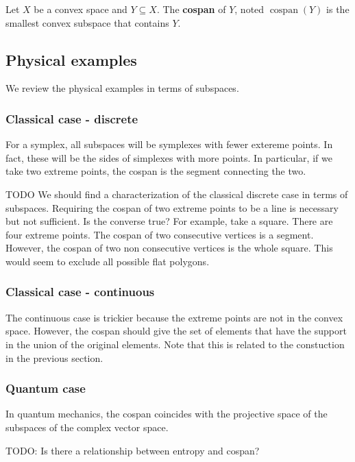 \documentclass[11pt]{article}
\DeclareMathOperator{\cospan}{cospan}
\begin{document}
\begin{defn}
	Let $X$ be a convex space and $Y \subseteq X$. The \textbf{cospan} of $Y$, noted $\cospan(Y)$ is the smallest convex subspace that contains $Y$.
\end{defn}


\subsection{Physical examples}

We review the physical examples in terms of subspaces.

\subsubsection{Classical case - discrete}

For a symplex, all subspaces will be symplexes with fewer extereme points. In fact, these will be the sides of simplexes with more points. In particular, if we take two extreme points, the cospan is the segment connecting the two.

TODO We should find a characterization of the classical discrete case in terms of subspaces. Requiring the cospan of two extreme points to be a line is necessary but not sufficient. Is the converse true? For example, take a square. There are four extreme points. The cospan of two consecutive vertices is a segment. However, the cospan of two non consecutive vertices is the whole square. This would seem to exclude all possible flat polygons.

\subsubsection{Classical case - continuous}

The continuous case is trickier because the extreme points are not in the convex space. However, the cospan should give the set of elements that have the support in the union of the original elements. Note that this is related to the constuction in the previous section.

\subsubsection{Quantum case}

In quantum mechanics, the cospan coincides with the projective space of the subspaces of the complex vector space.

TODO: Is there a relationship between entropy and cospan? 
\end{document}
